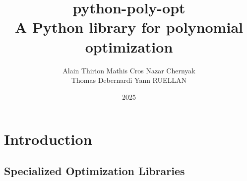 \documentclass[12pt,a4paper]{article}
\title{
  \textbf{python-poly-opt} \\
  \large{A Python library for polynomial optimization}
}
\author{
    Alain Thirion \quad
    Mathis Cros \quad
    Nazar Chernyak \\
    Thomas Debernardi \quad
    Yann RUELLAN
}
\date{2025}
\begin{document}
\maketitle

\section{Introduction}
\subsection{Specialized Optimization Libraries}
\end{document}

